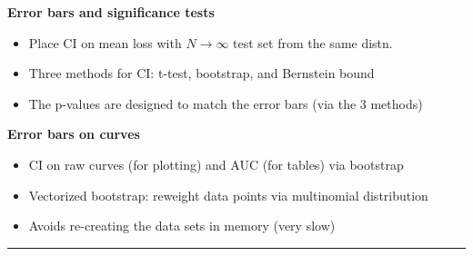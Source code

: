\documentclass[a0,landscape]{a0poster}
\newcommand{\sectionx}{\textbf}
\begin{document}
\begin{multicols}{3}
\sectionx{Error bars and significance tests}
\begin{itemize}
  \item Place CI on mean loss with $N \rightarrow \infty$ test set from the same distn.
  \item Three methods for CI: t-test, bootstrap, and Bernstein bound
  \item The p-values are designed to match the error bars (via the 3 methods)
\end{itemize}

\sectionx{Error bars on curves}
\begin{itemize}
  \item CI on raw curves (for plotting) and AUC (for tables) via bootstrap
  \item Vectorized bootstrap: reweight data points via multinomial distribution
  \item Avoids re-creating the data sets in memory (very slow)
\end{itemize}

\end{multicols}

\vspace{5mm}
\hrule
\vspace{5mm}
\end{document}
